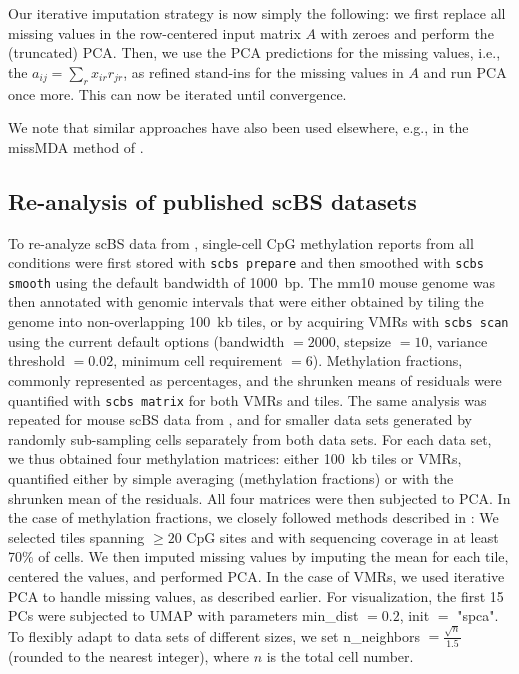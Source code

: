 \documentclass[twocolumn,10pt]{article}
\begin{document}
Our iterative imputation strategy is now simply the following: we first replace all missing values in the row-centered input matrix $A$ with zeroes and perform the (truncated) PCA.
Then, we use the PCA predictions for the missing values, i.e., the $a_{ij}=\sum_r x_{ir} r_{jr}$, as refined stand-ins for the missing values in $A$ and run PCA once more.
This can now be iterated until convergence.

We note that similar approaches have also been used elsewhere, e.g., in the missMDA method of \citet{missMDA}.

\subsection{Re-analysis of published scBS datasets}
To re-analyze scBS data from \citet{kremer_scnmt}, single-cell CpG methylation reports from all conditions were first stored with \texttt{scbs prepare} and then smoothed with \texttt{scbs smooth} using the default bandwidth of 1000~bp.
The mm10 mouse genome was then annotated with genomic intervals that were either obtained by tiling the genome into non-overlapping 100~kb tiles, or by acquiring VMRs with \texttt{scbs scan} using the current default options (bandwidth $=2000$, stepsize $=10$, variance threshold $= 0.02$, minimum cell requirement $=6$).
Methylation fractions, commonly represented as percentages, and the shrunken means of residuals were quantified with \texttt{scbs matrix} for both VMRs and tiles.
The same analysis was repeated for mouse scBS data from \citet{luo2017single}, and for smaller data sets generated by randomly sub-sampling cells separately from both data sets.
For each data set, we thus obtained four methylation matrices:
either 100~kb tiles or VMRs, quantified either by simple averaging (methylation fractions) or with the shrunken mean of the residuals.
All four matrices were then subjected to PCA.
In the case of methylation fractions, we closely followed methods described in \citet{luo2017single}:
We selected tiles spanning $\ge20$ CpG sites and with sequencing coverage in at least 70\% of cells.
We then imputed missing values by imputing the mean for each tile, centered the values, and performed PCA.
In the case of VMRs, we used iterative PCA to handle missing values, as described earlier.
For visualization, the first 15 PCs were subjected to UMAP with parameters min\_dist $=0.2$, init $=$ "spca".
To flexibly adapt to data sets of different sizes, we set n\_neighbors  $=\frac{\sqrt{n}}{1.5}$ (rounded to the nearest integer), where $n$ is the total cell number.
\end{document}

